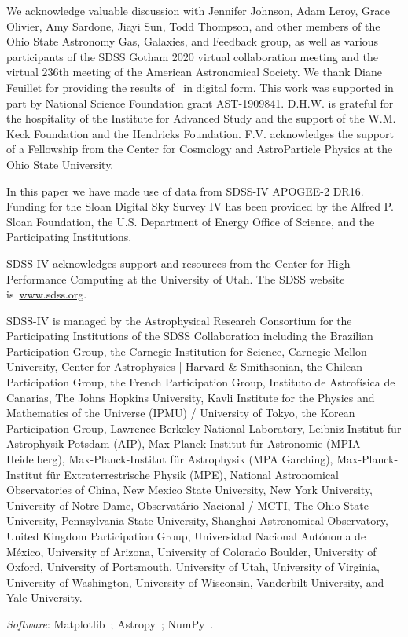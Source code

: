 \documentclass[draft2.tex]{subfiles}
\begin{document}
We acknowledge valuable discussion with Jennifer Johnson, Adam Leroy, Grace 
Olivier, Amy Sardone, Jiayi Sun, Todd Thompson, and other members of the Ohio 
State Astronomy Gas, Galaxies, and Feedback group, as well as various 
participants of the SDSS Gotham 2020 virtual collaboration meeting and the 
virtual 236th meeting of the American Astronomical Society. 
We thank Diane Feuillet for providing the results of~\citet{Feuillet2019} in 
digital form. 
This work was supported in part by National Science Foundation grant 
AST-1909841. 
D.H.W. is grateful for the hospitality of the Institute for Advanced Study and 
the support of the W.M. Keck Foundation and the Hendricks Foundation. 
F.V. acknowledges the support of a Fellowship from the Center for Cosmology and 
AstroParticle Physics at the Ohio State University. 
\par 
In this paper we have made use of data from SDSS-IV APOGEE-2 DR16. 
Funding for the Sloan Digital Sky 
Survey IV has been provided by the 
Alfred P. Sloan Foundation, the U.S. 
Department of Energy Office of 
Science, and the Participating 
Institutions. 
\par 
SDSS-IV acknowledges support and 
resources from the Center for High 
Performance Computing  at the 
University of Utah. The SDSS 
website is~\url{www.sdss.org}.
\par 
SDSS-IV is managed by the 
Astrophysical Research Consortium 
for the Participating Institutions 
of the SDSS Collaboration including 
the Brazilian Participation Group, 
the Carnegie Institution for Science, 
Carnegie Mellon University, Center for 
Astrophysics | Harvard \& 
Smithsonian, the Chilean Participation 
Group, the French Participation Group, 
Instituto de Astrof\'isica de 
Canarias, The Johns Hopkins 
University, Kavli Institute for the 
Physics and Mathematics of the 
Universe (IPMU) / University of 
Tokyo, the Korean Participation Group, 
Lawrence Berkeley National Laboratory, 
Leibniz Institut f\"ur Astrophysik 
Potsdam (AIP),  Max-Planck-Institut 
f\"ur Astronomie (MPIA Heidelberg), 
Max-Planck-Institut f\"ur 
Astrophysik (MPA Garching), 
Max-Planck-Institut f\"ur 
Extraterrestrische Physik (MPE), 
National Astronomical Observatories of 
China, New Mexico State University, 
New York University, University of 
Notre Dame, Observat\'ario 
Nacional / MCTI, The Ohio State 
University, Pennsylvania State 
University, Shanghai 
Astronomical Observatory, United 
Kingdom Participation Group, 
Universidad Nacional Aut\'onoma 
de M\'exico, University of Arizona, 
University of Colorado Boulder, 
University of Oxford, University of 
Portsmouth, University of Utah, 
University of Virginia, University 
of Washington, University of 
Wisconsin, Vanderbilt University, 
and Yale University.

\textit{Software}: Matplotlib~\citep{Matplotlib}; Astropy~\citep{Astropy2013, 
Astropy2018}; NumPy~\citep{NumPy}. 
\end{document}
